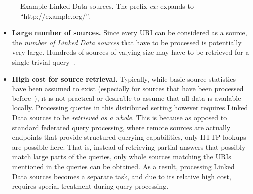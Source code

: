 \begin{figure}[ht]
\vspace{-0.3cm}
  \caption{Example Linked Data sources. The prefix \emph{ex:} expands
    to ``http://example.org/''.}
  \label{fig:sources}
\vspace{-0.3cm}
\end{figure}

\begin{itemize}
\item \textbf{Large number of sources.} Since every URI can be
  considered as a source, the \emph{number of Linked Data sources}
  that have to be processed is potentially very large. Hundreds of
  sources of varying size may have to be retrieved for a single
  trivial query~\cite{ladwig_linked_2010}.

\item \textbf{High cost for source retrieval.} Typically, while basic
  source statistics have been assumed to exist (especially for sources
  that have been processed before~\cite{ladwig_linked_2010}), it is
  not practical or desirable to assume that all data is available
  locally. Processing queries in
  this distributed setting however requires Linked Data sources to be
  \emph{retrieved as a whole}. This is because as opposed to standard
  federated query processing, where remote sources are actually
  endpoints that provide structured querying capabilities, only HTTP
  lookups are possible here. That is, instead of retrieving partial
  answers that possibly match large parts of the queries, only whole
  sources matching the URIs mentioned in the queries can be
  obtained. As a result, processing Linked Data sources becomes a
  separate task, and due to its relative high cost, requires special
  treatment during query processing.


\end{itemize}
